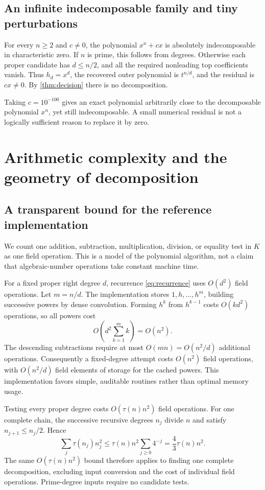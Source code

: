 \documentclass[11pt,a4paper]{article}
\theoremstyle{definition}
\begin{document}
\subsection{An infinite indecomposable family and tiny perturbations}
For every $n\ge2$ and $c\ne0$, the polynomial $x^n+cx$ is absolutely indecomposable in characteristic zero. If $n$ is prime, this follows from degrees. Otherwise each proper candidate has $d\le n/2$, and all the required nonleading top coefficients vanish. Thus $h_d=x^d$, the recovered outer polynomial is $t^{n/d}$, and the residual is $cx\ne0$. By \cref{thm:decision} there is no decomposition.

Taking $c=10^{-100}$ gives an exact polynomial arbitrarily close to the decomposable polynomial $x^n$, yet still indecomposable. A small numerical residual is not a logically sufficient reason to replace it by zero.

\section{Arithmetic complexity and the geometry of decomposition}
\subsection{A transparent bound for the reference implementation}
We count one addition, subtraction, multiplication, division, or equality test in $K$ as one field operation. This is a model of the polynomial algorithm, not a claim that algebraic-number operations take constant machine time.

For a fixed proper right degree $d$, recurrence \eqref{eq:recurrence} uses $O(d^2)$ field operations. Let $m=n/d$. The implementation stores $1,h,\ldots,h^m$, building successive powers by dense convolution. Forming $h^k$ from $h^{k-1}$ costs $O(kd^2)$ operations, so all powers cost
\[
 O\!\left(d^2\sum_{k=1}^{m}k\right)=O(n^2).
\]
The descending subtractions require at most $O(mn)=O(n^2/d)$ additional operations. Consequently a fixed-degree attempt costs $O(n^2)$ field operations, with $O(n^2/d)$ field elements of storage for the cached powers. This implementation favors simple, auditable routines rather than optimal memory usage.

Testing every proper degree costs $O(\tau(n)n^2)$ field operations. For one complete chain, the successive recursive degrees $n_j$ divide $n$ and satisfy $n_{j+1}\le n_j/2$. Hence
\[
 \sum_j \tau(n_j)n_j^2
 \le \tau(n)n^2\sum_{j\ge0}4^{-j}
 =\frac43\tau(n)n^2.
\]
The same $O(\tau(n)n^2)$ bound therefore applies to finding one complete decomposition, excluding input conversion and the cost of individual field operations. Prime-degree inputs require no candidate tests.
\end{document}
